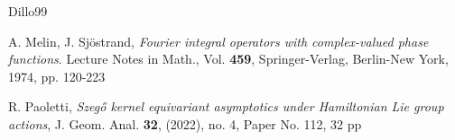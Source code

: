 \documentclass[12pt,a4paper]{article}
\theoremstyle{plain}
\theoremstyle{definition}
\begin{document}
\begin{thebibliography}{Dillo99}


A. Melin, J. Sj\"{o}strand, 
{\em Fourier integral operators with complex-valued phase functions}.
%
Lecture Notes in Math., Vol. \textbf{459},
Springer-Verlag, Berlin-New York, 1974, pp. 120-223












R. Paoletti, {\em 
Szeg\H{o} kernel equivariant asymptotics under Hamiltonian Lie group actions},
J. Geom. Anal. \textbf{32}, 
(2022), no. 4, Paper No. 112, 32 pp


\end{thebibliography}
\end{document}
